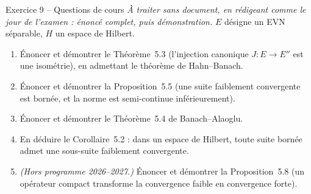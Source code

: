 \documentclass[11pt,a4paper]{article}
\theoremstyle{definition}
\begin{document}
\begin{exo}{Exercice 9 -- Questions de cours}
\emph{À traiter sans document, en rédigeant comme le jour de l'examen : énoncé complet, puis démonstration.} $E$ désigne un EVN séparable, $H$ un espace de Hilbert.
\begin{enumerate}[label=(\alph*)]
  \item Énoncer et démontrer le Théorème~5.3 (l'injection canonique $J:E\to E''$ est une isométrie), en admettant le théorème de Hahn--Banach.
  \item Énoncer et démontrer la Proposition~5.5 (une suite faiblement convergente est bornée, et la norme est semi-continue inférieurement).
  \item Énoncer et démontrer le Théorème~5.4 de Banach--Alaoglu.
  \item En déduire le Corollaire~5.2 : dans un espace de Hilbert, toute suite bornée admet une sous-suite faiblement convergente.
  \item \emph{(Hors programme 2026--2027.)} Énoncer et démontrer la Proposition~5.8 (un opérateur compact transforme la convergence faible en convergence forte).
\end{enumerate}
\end{exo}
\end{document}
